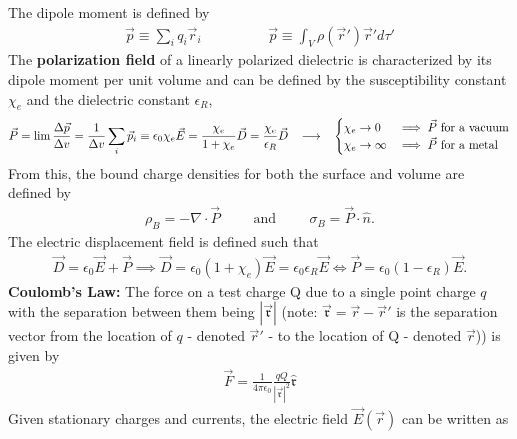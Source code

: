 The dipole moment is defined by
\begin{align}
	\vec{p} \equiv \sum_{i}^{}q_i \vec{r}_i \hspace{2cm} \vec{p}\equiv \int_V \rho(\vec{r}')\vec{r}' d\tau'
\end{align}
The \textbf{polarization field} of a linearly polarized dielectric is characterized by its dipole moment per unit volume and can be defined by the susceptibility constant $\chi_e$ and the dielectric constant $\epsilon_R$,
\begin{align}
	\vec{P} =\lim \frac{\Delta \vec{p}}{\Delta v} = \frac{1}{\Delta v}\sum_{i}\vec{p}_i\equiv \epsilon_0 \chi_e \vec{E}  = \frac{\chi_e}{1+\chi_e}\vec{D} = \frac{\chi_e}{\epsilon_R}\vec{D}\hspace{0.3cm}\longrightarrow \hspace{0.3cm}\begin{cases}
		\chi_e \rightarrow 0 & \implies \vec{P} \textrm{ for a vacuum} \\ \chi_e \rightarrow \infty & \implies \vec{P} \textrm{ for a metal}
		\end{cases}
\end{align}
From this, the bound charge densities for both the surface and volume are defined by
\begin{align}
	\rho_B = -\nabla \cdot \vec{P} \hspace{1cm}\textrm{and}\hspace{1cm}	\sigma_B = \vec{P} \cdot \hat{n}.
\end{align} 
The electric displacement field is defined such that
\begin{align}
	\vec{D} = \epsilon_0\vec{E}+\vec{P} \implies \vec{D} = \epsilon_0(1+\chi_e)\vec{E}=\epsilon_0 \epsilon_R \vec{E}\Longleftrightarrow \vec{P} = \epsilon_0(1-\epsilon_R)\vec{E}.
\end{align}
\textbf{Coulomb's Law:} The force on a test charge Q due to a single point charge $q$ with the separation between them being $|\vec{\mathfrak{r}}|$ (note: $\vec{\mathfrak{r}}=\vec{r}-\vec{r}'$ is the separation vector from the location of $q$ - denoted $\vec{r}'$ - to the location of Q - denoted $\vec{r}$)) is given by
\begin{align}
	\vec{F} = \frac{1}{4\pi\epsilon_0}\frac{qQ}{|\vec{\mathfrak{r}}|^2}\hat{\mathfrak{r}}
\end{align}
Given stationary charges and currents, the electric field $\vec{E}(\vec{r})$ can be written as
